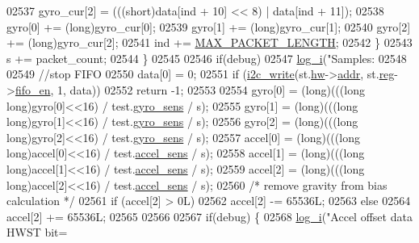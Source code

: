\begin{DoxyCode}
{{{{{{{{{{{{{{{{{{{{{{{{{{{{02537             gyro\_cur[2] = (((short)data[ind + 10] << 8) | data[ind + 11]);
02538             gyro[0] += (long)gyro\_cur[0];
02539             gyro[1] += (long)gyro\_cur[1];
02540             gyro[2] += (long)gyro\_cur[2];
02541             ind += \hyperlink{inv__mpu_8c_a973c680573b37fc359fc68d0707da355}{MAX\_PACKET\_LENGTH};
02542         \}
02543         s += packet\_count;
02544     \}
02545 
02546     \textcolor{keywordflow}{if}(debug)
02547         \hyperlink{inv__mpu_8c_a67fc07fa528d8e62dc7b88a847b563f5}{log\_i}(\textcolor{stringliteral}{"Samples: %
02548 
02549     \textcolor{comment}{//stop FIFO}
02550     data[0] = 0;
02551     \textcolor{keywordflow}{if} (\hyperlink{_i2_c_8c_ac0f145afe8d662af199043939f4398d6}{i2c\_write}(st.\hyperlink{structgyro__state__s_a5bac30a96752691e4cc723735060e360}{hw}->\hyperlink{structhw__s_a4c34a946600e9d68b6355d23f54d291b}{addr}, st.\hyperlink{structgyro__state__s_ae857e1285c583b7438a208edd691a38e}{reg}->\hyperlink{structgyro__reg__s_a480d2fa5db4e9c42c61d886d09c5e448}{fifo\_en}, 1, data))
02552         \textcolor{keywordflow}{return} -1;
02553 
02554     gyro[0] = (long)(((\textcolor{keywordtype}{long} \textcolor{keywordtype}{long})gyro[0]<<16) / test.\hyperlink{structtest__s_a32da1174cf6569aa99bdff70055bb45a}{gyro\_sens} / s);
02555     gyro[1] = (long)(((\textcolor{keywordtype}{long} \textcolor{keywordtype}{long})gyro[1]<<16) / test.\hyperlink{structtest__s_a32da1174cf6569aa99bdff70055bb45a}{gyro\_sens} / s);
02556     gyro[2] = (long)(((\textcolor{keywordtype}{long} \textcolor{keywordtype}{long})gyro[2]<<16) / test.\hyperlink{structtest__s_a32da1174cf6569aa99bdff70055bb45a}{gyro\_sens} / s);
02557     accel[0] = (long)(((\textcolor{keywordtype}{long} \textcolor{keywordtype}{long})accel[0]<<16) / test.\hyperlink{structtest__s_a22a1d8ebbceb431baa0dfdc911fbc8ab}{accel\_sens} / s);
02558     accel[1] = (long)(((\textcolor{keywordtype}{long} \textcolor{keywordtype}{long})accel[1]<<16) / test.\hyperlink{structtest__s_a22a1d8ebbceb431baa0dfdc911fbc8ab}{accel\_sens} / s);
02559     accel[2] = (long)(((\textcolor{keywordtype}{long} \textcolor{keywordtype}{long})accel[2]<<16) / test.\hyperlink{structtest__s_a22a1d8ebbceb431baa0dfdc911fbc8ab}{accel\_sens} / s);
02560     \textcolor{comment}{/* remove gravity from bias calculation */}
02561     \textcolor{keywordflow}{if} (accel[2] > 0L)
02562         accel[2] -= 65536L;
02563     \textcolor{keywordflow}{else}
02564         accel[2] += 65536L;
02565 
02566 
02567     \textcolor{keywordflow}{if}(debug) \{
02568         \hyperlink{inv__mpu_8c_a67fc07fa528d8e62dc7b88a847b563f5}{log\_i}(\textcolor{stringliteral}{"Accel offset data HWST bit=%
}}}}}}}}}}}}}}}}}}}}}}}}}}}}}}
\end{DoxyCode}
